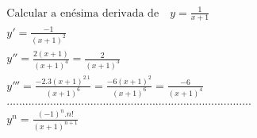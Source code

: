 \begin{ex}
\begin{align}
&\text{Calcular a enésima derivada de} \quad y=\frac{1}{x+1}\nonumber\\
&y'=\frac{-1}{(x+1)^2}\nonumber\\
&y''=\frac{2(x+1)}{(x+1)^4}=\frac{2}{(x+1)^3}\nonumber\\
&y'''=\frac{-2.3(x+1)^2.1}{(x+1)^6}=\frac{-6(x+1)^2}{(x+1)^6}=\frac{-6}{(x+1)^4}\nonumber\\
&...............................................................................\nonumber\\
&y^{n}=\frac{(-1)^{n}.n!}{(x+1)^{n+1}}\nonumber
\end{align}
\end{ex}